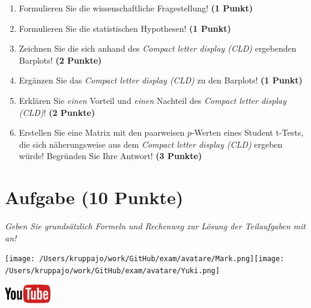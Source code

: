 \documentclass[a4paper, 9pt]{scrartcl}\usepackage[]{graphicx}\usepackage[]{xcolor}
\begin{document}
\begin{enumerate}
  \item Formulieren Sie die wissenschaftliche Fragestellung! \textbf{(1 Punkt)}
  \item Formulieren Sie die statistischen Hypothesen! \textbf{(1 Punkt)}
\item Zeichnen Sie die sich anhand des \textit{Compact letter display (CLD)} ergebenden Barplots! \textbf{(2 Punkte)}
\item Ergänzen Sie das \textit{Compact letter display (CLD)} zu den Barplots! \textbf{(1 Punkt)}
\item Erklären Sie \textit{einen} Vorteil und \textit{einen} Nachteil des \textit{Compact letter display (CLD)}! \textbf{(2 Punkte)}
\item Erstellen Sie eine Matrix mit den paarweisen $p$-Werten eines Student t-Tests, die sich näherungsweise aus dem \textit{Compact letter display (CLD)} ergeben würde! Begründen Sie Ihre Antwort! \textbf{(3 Punkte)}
\end{enumerate}

 
\clearpage

\section{Aufgabe \hfill (10 Punkte)}

\textit{Geben Sie grundsätzlich Formeln und Rechenweg zur Lösung der Teilaufgaben mit an!} \\[1Ex]
 

 
\begin{minipage}[t]{0.5\textwidth}
\texttt{[image: /Users/kruppajo/work/GitHub/exam/avatare/Mark.png]}\hspace{-4mm}\texttt{[image: /Users/kruppajo/work/GitHub/exam/avatare/Yuki.png]}
\end{minipage}
\begin{minipage}[t]{0.5\textwidth}
\hfill
\href{https://youtu.be/RagTFFKFbFg}{\includegraphics[width = 2cm]{img/youtube}}
\end{minipage}
\vspace{1ex}
\end{document}
